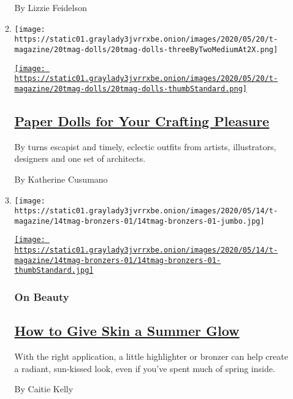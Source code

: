 \begin{enumerate}
\begin{enumerate}
    By Lizzie Feidelson
  \item
    \texttt{[image: https://static01.graylady3jvrrxbe.onion/images/2020/05/20/t-magazine/20tmag-dolls/20tmag-dolls-threeByTwoMediumAt2X.png]}

    \href{/2020/05/20/t-magazine/paper-dolls.html}{\texttt{[image: https://static01.graylady3jvrrxbe.onion/images/2020/05/20/t-magazine/20tmag-dolls/20tmag-dolls-thumbStandard.png]}}

    \hypertarget{paper-dolls-for-your-crafting-pleasure}{%
    \subsection{\texorpdfstring{\href{/2020/05/20/t-magazine/paper-dolls.html}{Paper
    Dolls for Your Crafting
    Pleasure}}{Paper Dolls for Your Crafting Pleasure}}\label{paper-dolls-for-your-crafting-pleasure}}

    By turns escapist and timely, eclectic outfits from artists,
    illustrators, designers and one set of architects.

    By Katherine Cusumano
  \item
    \texttt{[image: https://static01.graylady3jvrrxbe.onion/images/2020/05/14/t-magazine/14tmag-bronzers-01/14tmag-bronzers-01-jumbo.jpg]}

    \href{/2020/05/15/t-magazine/best-bronzers-highlighters-beauty.html}{\texttt{[image: https://static01.graylady3jvrrxbe.onion/images/2020/05/14/t-magazine/14tmag-bronzers-01/14tmag-bronzers-01-thumbStandard.jpg]}}

    \hypertarget{on-beauty}{%
    \subsubsection{On Beauty}\label{on-beauty}}

    \hypertarget{how-to-give-skin-a-summer-glow}{%
    \subsection{\texorpdfstring{\href{/2020/05/15/t-magazine/best-bronzers-highlighters-beauty.html}{How
    to Give Skin a Summer
    Glow}}{How to Give Skin a Summer Glow}}\label{how-to-give-skin-a-summer-glow}}

    With the right application, a little highlighter or bronzer can help
    create a radiant, sun-kissed look, even if you've spent much of
    spring inside.

    By Caitie Kelly
  \end{enumerate}
\end{enumerate}

